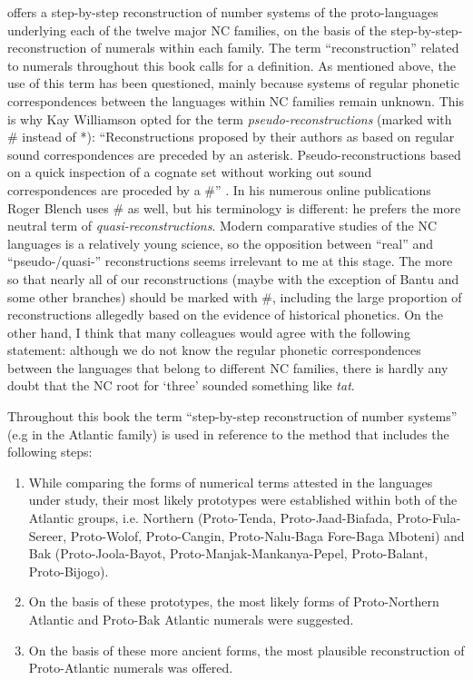  offers a step-by-step reconstruction of number systems of the proto-languages underlying each of the twelve major NC families, on the basis of the step-by-step-reconstruction of numerals within each family. The term “reconstruction” related to numerals throughout this book calls for a definition.  As mentioned above, the use of this term has been questioned, mainly because systems of regular phonetic correspondences between the languages within NC families remain unknown. This is why Kay Williamson opted for the term \textit{pseudo-reconstructions} (marked with \# instead of *): “Reconstructions proposed by their authors as based on regular sound correspondences are preceded by an asterisk. Pseudo-reconstructions based on a quick inspection of a cognate set without working out sound correspondences are proceded by a \#” \citep[251]{Williamson1989b}. In his numerous online publications Roger Blench uses \# as well, but his terminology is different: he prefers the more neutral term of \textit{quasi-reconstructions}. Modern comparative studies of the NC languages is a relatively young science, so the opposition between “real” and “pseudo-/quasi-” reconstructions seems irrelevant to me at this stage. The more so that nearly all of our reconstructions (maybe with the exception of Bantu and some other branches) should be marked with \#, including the large proportion of reconstructions allegedly based on the evidence of historical phonetics. On the other hand, I think that many colleagues would agree with the following statement: although we do not know the regular phonetic correspondences between the languages that belong to different NC families, there is hardly any doubt that the NC root for ‘three’ sounded something like \textit{tat}.

Throughout this book the term “step-by-step reconstruction of number systems” (e.g in the Atlantic family) is used in reference to the method that includes the following steps:

\begin{enumerate}
\item While comparing the forms of numerical terms attested in the languages under study, their most likely prototypes were established within both of the Atlantic groups, i.e. Northern (Proto-Tenda, Proto-Jaad-Biafada, Proto-Fula-Sereer, Proto-Wolof, Proto-Cangin, Proto-Nalu-Baga Fore-Baga Mboteni) and Bak (Proto-Joola-Bayot, Proto-Manjak-Mankanya-Pepel, Proto-Balant, Proto-Bijogo).
\item On the basis of these prototypes, the most likely forms of Proto-Northern Atlantic and Proto-Bak Atlantic numerals were suggested.
\item On the basis of these more ancient forms, the most plausible reconstruction of Proto-Atlantic numerals was offered.
\end{enumerate}

